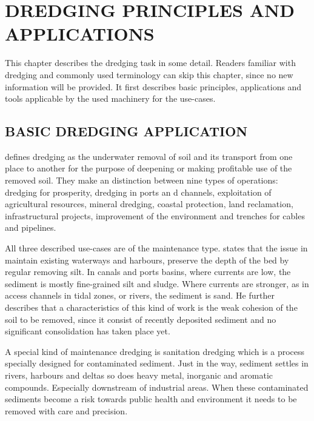 \chapter{DREDGING PRINCIPLES AND APPLICATIONS}\label{chap:dredgingprocess}
This chapter describes the dredging task in some detail. Readers familiar with dredging and commonly used terminology can skip this chapter, since no new information will be provided. It first describes basic principles, applications and tools applicable by the used machinery for the use-cases.

\section{BASIC DREDGING APPLICATION}\label{sec:basic dredging applications}
\citet{training_institute_for_dredging_ingewijden_2008} defines dredging as the underwater removal of soil and its transport from one place to another for the purpose of deepening or making profitable use of the removed soil. They make an distinction between nine types of operations: dredging for prosperity, dredging in ports an
d channels, exploitation of agricultural resources, mineral dredging, coastal protection, land reclamation, infrastructural projects, improvement of the environment and trenches for cables and pipelines.

All three described use-cases are of the maintenance type. \citet{van_der_schrieck_dredging_2014} states that the issue in maintain existing waterways and harbours, preserve the depth of the bed by regular removing silt. In canals and ports basins, where currents are low, the sediment is mostly fine-grained silt and sludge. Where currents are stronger, as in access channels in tidal zones, or rivers, the sediment is sand. He further describes that a characteristics of this kind of work is the weak cohesion of the soil to be removed, since it consist of recently deposited sediment and no significant consolidation has taken place yet.

A special kind of maintenance dredging is sanitation dredging which is a process specially designed for contaminated sediment. Just in the way, sediment settles in rivers, harbours and deltas so does heavy metal, inorganic and aromatic compounds. Especially downstream of industrial areas. When these contaminated sediments become a risk towards public health and environment it needs to be removed with care and precision.

